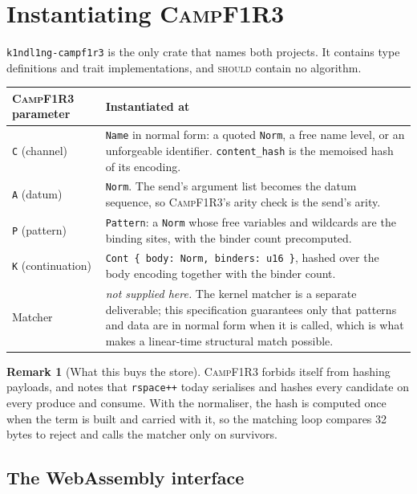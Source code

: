 \documentclass[11pt,a4paper]{article}
\newcommand{\code}[1]{\texttt{#1}}
\newcommand{\Camp}{\textsc{CampF1R3}}
\newcommand{\SHOULD}{\textsc{should}}
\theoremstyle{definition}
\newtheorem{remark}[definition]{Remark}
\theoremstyle{plain}
\begin{document}
\section{Instantiating \Camp}\label{sec:glue}

\code{k1ndl1ng-campf1r3} is the only crate that names both projects. It contains
type definitions and trait implementations, and \SHOULD{} contain no algorithm.

\begin{center}
\begin{tabularx}{\linewidth}{@{}l>{\raggedright\arraybackslash}X@{}}
\toprule
\Camp{} parameter & Instantiated at\\
\midrule
\code{C} (channel) & \code{Name} in normal form: a quoted \code{Norm}, a free
name level, or an unforgeable identifier. \code{content\_hash} is the memoised
hash of its encoding.\\
\code{A} (datum) & \code{Norm}. The send's argument list becomes the datum
sequence, so \Camp's arity check is the send's arity.\\
\code{P} (pattern) & \code{Pattern}: a \code{Norm} whose free variables and
wildcards are the binding sites, with the binder count precomputed.\\
\code{K} (continuation) & \code{Cont \{ body: Norm, binders: u16 \}}, hashed over
the body encoding together with the binder count.\\
Matcher & \emph{not supplied here.} The kernel matcher is a separate
deliverable; this specification guarantees only that patterns and data are in
normal form when it is called, which is what makes a linear-time structural
match possible.\\
\bottomrule
\end{tabularx}
\end{center}

\begin{remark}[What this buys the store]
\Camp{} forbids itself from hashing payloads, and notes that \code{rspace++}
today serialises and hashes every candidate on every produce and consume. With
the normaliser, the hash is computed once when the term is built and carried
with it, so the matching loop compares 32 bytes to reject and calls the matcher
only on survivors.
\end{remark}

\subsection{The WebAssembly interface}
\end{document}
